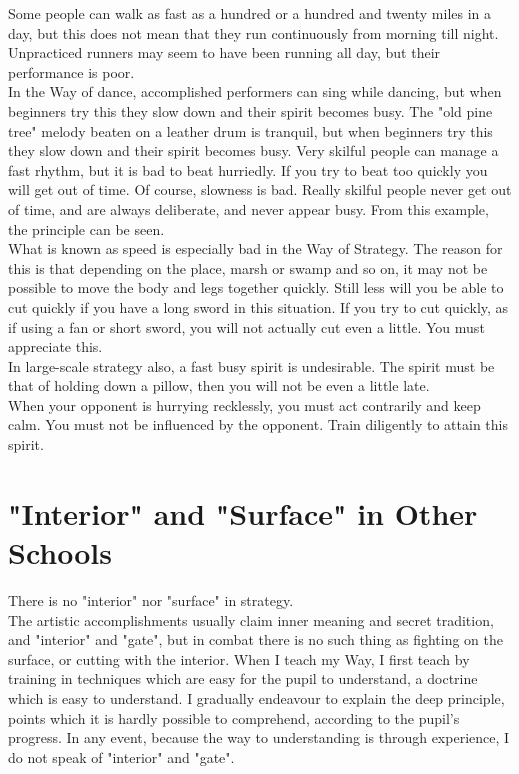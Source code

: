Some people can walk as fast as a hundred or a hundred and twenty miles in a day, but this does not mean that they run continuously from morning till night. Unpracticed runners may seem to have been running all day, but their performance is poor.\\

In the Way of dance, accomplished performers can sing while dancing, but when beginners try this they slow down and their spirit becomes busy. The "old pine tree" melody beaten on a leather drum is tranquil, but when beginners try this they slow down and their spirit becomes busy. Very skilful people can manage a fast rhythm, but it is bad to beat hurriedly. If you try to beat too quickly you will get out of time. Of course, slowness is bad. Really skilful people never get out of time, and are always deliberate, and never appear busy. From this example, the principle can be seen.\\

What is known as speed is especially bad in the Way of Strategy. The reason for this is that depending on the place, marsh or swamp and so on, it may not be possible to move the body and legs together quickly. Still less will you be able to cut quickly if you have a long sword in this situation. If you try to cut quickly, as if using a fan or short sword, you will not actually cut even a little. You must appreciate this.\\

In large-scale strategy also, a fast busy spirit is undesirable. The spirit must be that of holding down a pillow, then you will not be even a little late.\\

When your opponent is hurrying recklessly, you must act contrarily and keep calm. You must not be influenced by the opponent. Train diligently to attain this spirit.\\
\section{"Interior" and "Surface" in Other Schools}

There is no "interior" nor "surface" in strategy.\\

The artistic accomplishments usually claim inner meaning and secret tradition, and "interior" and "gate", but in combat there is no such thing as fighting on the surface, or cutting with the interior. When I teach my Way, I first teach by training in techniques which are easy for the pupil to understand, a doctrine which is easy to understand. I gradually endeavour to explain the deep principle, points which it is hardly possible to comprehend, according to the pupil's progress. In any event, because the way to understanding is through experience, I do not speak of "interior" and "gate".\\

